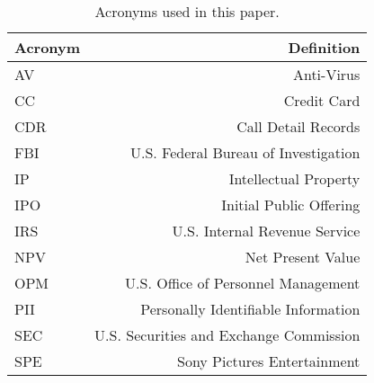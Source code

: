 \documentclass[11pt]{../uhthesis}
\begin{document}
\begin{table}[htbp]
  \caption[Acronym List.]{Acronyms used in this paper.}

  \label{tab:glossary}
  \begin{center}
    \begin{tabular}{|l|r|}
      \hline
      \textbf{Acronym} & \textbf{Definition} \\
      \hline
      AV & Anti-Virus \\ \hline
      CC & Credit Card \\ \hline
      CDR & Call Detail Records \\ \hline
      FBI & U.S. Federal Bureau of Investigation \\ \hline
      IP & Intellectual Property \\ \hline
      IPO & Initial Public Offering \\ \hline
      IRS & U.S. Internal Revenue Service \\ \hline
      NPV & Net Present Value \\ \hline
      OPM & U.S. Office of Personnel Management \\ \hline
      PII & Personally Identifiable Information \\ \hline
      SEC & U.S. Securities and Exchange Commission \\ \hline
      SPE & Sony Pictures Entertainment \\ \hline
    \end{tabular}
  \end{center}
\end{table}



\nocite{*}




\end{document}
